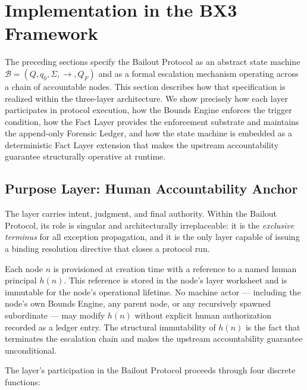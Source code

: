 \section{Implementation in the BX3 Framework}\label{sec:implementation}

The preceding sections specify the Bailout Protocol as an abstract state machine $\mathcal{B} = (Q, q_0, \Sigma, \rightarrow, Q_F)$ and as a formal escalation mechanism operating across a chain of accountable nodes. This section describes how that specification is realized within the \bxthree{} three-layer architecture. We show precisely how each layer participates in protocol execution, how the Bounds Engine enforces the trigger condition, how the Fact Layer provides the enforcement substrate and maintains the append-only Forensic Ledger, and how the state machine is embedded as a deterministic Fact Layer extension that makes the upstream accountability guarantee structurally operative at runtime.

\subsection{Purpose Layer: Human Accountability Anchor}\label{sec:purpose-layer}

The \purpose{} layer carries intent, judgment, and final authority. Within the Bailout Protocol, its role is singular and architecturally irreplaceable: it is the \emph{exclusive terminus} for all exception propagation, and it is the only layer capable of issuing a binding resolution directive that closes a protocol run.

Each \bxthree{} node $n$ is provisioned at creation time with a reference to a named human principal $h(n)$. This reference is stored in the node's \purpose{} layer worksheet and is immutable for the node's operational lifetime. No machine actor --- including the node's own Bounds Engine, any parent node, or any recursively spawned subordinate --- may modify $h(n)$ without explicit human authorization recorded as a ledger entry. The structural immutability of $h(n)$ is the fact that terminates the escalation chain and makes the upstream accountability guarantee unconditional.

The \purpose{} layer's participation in the Bailout Protocol proceeds through four discrete functions:

